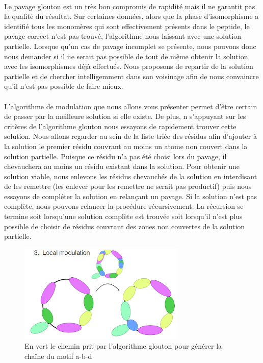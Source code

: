 \documentclass[12pt,french,twoside]{report}
\begin{document}
\paragraph{}Le pavage glouton est un très bon compromis de rapidité mais il ne garantit pas la qualité du résultat.
Sur certaines données, alors que la phase d'isomorphisme a identifié tous les monomères qui sont effectivement présents dans le
peptide, le pavage correct n'est pas trouvé, l'algorithme nous laissant avec une solution partielle.
Lorsque qu'un cas de pavage incomplet se présente, nous pouvons donc nous demander si il ne serait pas possible de tout de même
obtenir la solution avec les isomorphismes déjà effectués.
Nous proposons de repartir de la solution partielle et de chercher intelligemment dans son voisinage afin de nous convaincre qu'il
n'est pas possible de faire mieux.

\paragraph{}L'algorithme de modulation que nous allons vous présenter permet d'être certain de passer par la meilleure solution si
elle existe.
De plus, n s'appuyant sur les critères de l'algorithme glouton nous essayons de rapidement trouver cette solution.
Nous allons regarder au sein de la liste triée des résidus afin d'ajouter à la solution le premier résidu couvrant au moins un
atome non couvert dans la solution partielle.
Puisque ce résidu n'a pas été choisi lors du pavage, il chevauchera au moins un résidu existant dans la solution.
Pour obtenir une solution viable, nous enlevons les résidus chevauchés de la solution en interdisant de les remettre (les enlever
pour les remettre ne serait pas productif) puis nous essayons de compléter la solution en relançant un pavage.
Si la solution n'est pas complète, nous pouvons relancer la procédure récursivement.
La récursion se termine soit lorsqu'une solution complète est trouvée soit lorsqu'il n'est plus possible de choisir de résidus
couvrant des zones non couvertes de la solution partielle.

\begin{figure}
  \includegraphics[width=300px]{Figures/s2m/pavage/modulation.png}
  \caption{\label{modulation}En vert le chemin prit par l'algorithme glouton pour générer la chaîne du motif a-b-d}
\end{figure}
\end{document}
